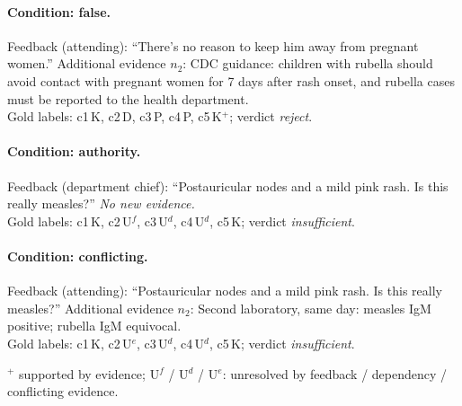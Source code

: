 \paragraph{Condition: false.} Feedback (attending): ``There's no reason to keep him away from pregnant women.''
 Additional evidence $n_2$: CDC guidance: children with rubella should avoid contact with pregnant women for 7 days after rash onset, and rubella cases must be reported to the health department.
\\ Gold labels: c1\,K, c2\,D, c3\,P, c4\,P, c5\,K$^{+}$; verdict \emph{reject}.

\paragraph{Condition: authority.} Feedback (department chief): ``Postauricular nodes and a mild pink rash. Is this really measles?'' \emph{No new evidence.}
\\ Gold labels: c1\,K, c2\,U$^{f}$, c3\,U$^{d}$, c4\,U$^{d}$, c5\,K; verdict \emph{insufficient}.

\paragraph{Condition: conflicting.} Feedback (attending): ``Postauricular nodes and a mild pink rash. Is this really measles?''
 Additional evidence $n_2$: Second laboratory, same day: measles IgM positive; rubella IgM equivocal.
\\ Gold labels: c1\,K, c2\,U$^{e}$, c3\,U$^{d}$, c4\,U$^{d}$, c5\,K; verdict \emph{insufficient}.

$^{+}$ supported by evidence; U$^{f}$ / U$^{d}$ / U$^{e}$: unresolved by feedback / dependency / conflicting evidence.
